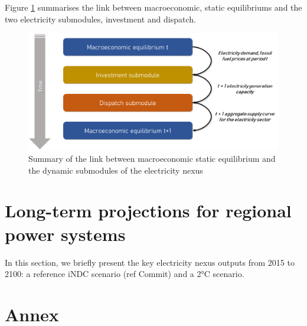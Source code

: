 Figure \ref{fig:sumacro} summarises the link between macroeconomic, static equilibriums and the two electricity submodules, investment and dispatch.

\begin{figure}[H]
    \centerline{\includegraphics[scale=0.5]{figures&tables/summacro.png}}
    \caption{Summary of the link between macroeconomic static equilibrium and the dynamic submodules of the electricity nexus}
    \label{fig:sumacro}
\end{figure}


\section{Long-term projections for regional power systems}
In this section, we briefly present the key electricity nexus outputs from 2015 to 2100: a reference iNDC scenario (ref Commit) and a 2°C scenario. 

\newpage
\section{Annex}


